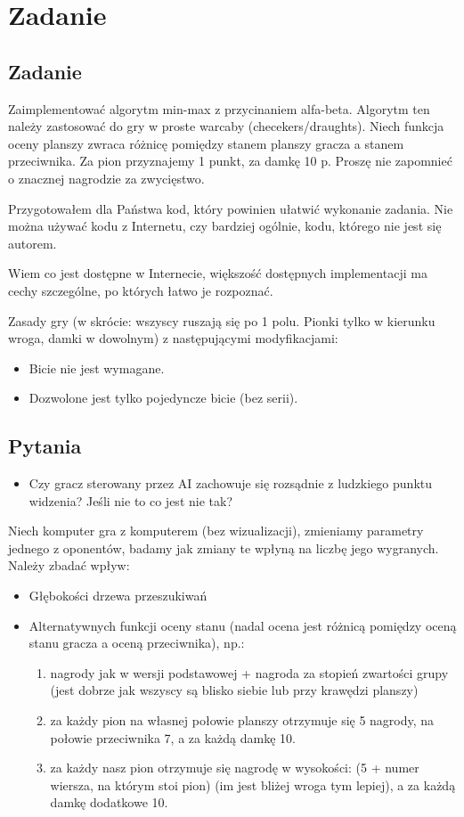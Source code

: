 \section{Zadanie}
\subsection{Zadanie}
Zaimplementować algorytm min-max z przycinaniem alfa-beta. Algorytm ten należy
zastosować do gry w proste warcaby (checekers/draughts). Niech funkcja oceny
planszy zwraca różnicę pomiędzy stanem planszy gracza a stanem przeciwnika. Za
pion przyznajemy 1 punkt, za damkę 10 p. Proszę nie zapomnieć o znacznej
nagrodzie za zwycięstwo.

Przygotowałem dla Państwa kod, który powinien ułatwić wykonanie zadania. Nie
można używać kodu z Internetu, czy bardziej ogólnie, kodu, którego nie jest
się autorem.

Wiem co jest dostępne w Internecie, większość dostępnych implementacji ma cechy
szczególne, po których łatwo je rozpoznać.

Zasady gry (w skrócie: wszyscy ruszają się po 1 polu. Pionki tylko w kierunku
wroga, damki w dowolnym) z następującymi modyfikacjami:

\begin{itemize}
  \item Bicie nie jest wymagane.
  \item Dozwolone jest tylko pojedyncze bicie (bez serii).
\end{itemize}

\subsection{Pytania}

\begin{itemize}
  \item Czy gracz sterowany przez AI zachowuje się rozsądnie z ludzkiego punktu
    widzenia? Jeśli nie to co jest nie tak?
\end{itemize}

Niech komputer gra z komputerem (bez wizualizacji), zmieniamy parametry jednego
z oponentów, badamy jak zmiany te wpłyną na liczbę jego wygranych. Należy
zbadać wpływ:
\begin{itemize}
  \item Głębokości drzewa przeszukiwań
  \item Alternatywnych funkcji oceny stanu (nadal ocena jest różnicą pomiędzy
    oceną stanu gracza a oceną przeciwnika), np.:
    \begin{enumerate}
      \item nagrody jak w wersji podstawowej + nagroda za stopień zwartości
        grupy (jest dobrze jak wszyscy są blisko siebie lub przy krawędzi
        planszy)
      \item za każdy pion na własnej połowie planszy otrzymuje się 5 nagrody,
        na połowie przeciwnika 7, a za każdą damkę 10.
      \item za każdy nasz pion otrzymuje się nagrodę w wysokości: (5 + numer
        wiersza, na którym stoi pion) (im jest bliżej wroga tym lepiej), a
        za każdą damkę dodatkowe 10.
    \end{enumerate}
\end{itemize}
